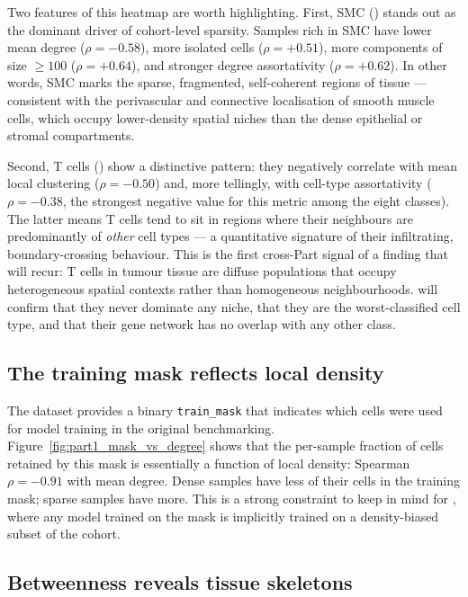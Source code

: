 Two features of this heatmap are worth highlighting. First, SMC () stands out as the dominant driver of cohort-level sparsity. Samples rich in SMC have lower mean degree ($\rho = -0.58$), more isolated cells ($\rho = +0.51$), more components of size $\geq 100$ ($\rho = +0.64$), and stronger degree assortativity ($\rho = +0.62$). In other words, SMC marks the sparse, fragmented, self-coherent regions of tissue --- consistent with the perivascular and connective localisation of smooth muscle cells, which occupy lower-density spatial niches than the dense epithelial or stromal compartments.

Second, T cells () show a distinctive pattern: they negatively correlate with mean local clustering ($\rho = -0.50$) and, more tellingly, with cell-type assortativity ($\rho = -0.38$, the strongest negative value for this metric among the eight classes). The latter means T cells tend to sit in regions where their neighbours are predominantly of \emph{other} cell types --- a quantitative signature of their infiltrating, boundary-crossing behaviour. This is the first cross-Part signal of a finding that will recur: T cells in tumour tissue are diffuse populations that occupy heterogeneous spatial contexts rather than homogeneous neighbourhoods.  will confirm that they never dominate any niche,  that they are the worst-classified cell type, and  that their gene network has no overlap with any other class.
\subsection*{The training mask reflects local density}

The dataset provides a binary \texttt{train\_mask} that indicates which cells were used for model training in the original benchmarking. Figure~\ref{fig:part1_mask_vs_degree} shows that the per-sample fraction of cells retained by this mask is essentially a function of local density: Spearman $\rho = -0.91$ with mean degree. Dense samples have less of their cells in the training mask; sparse samples have more. This is a strong constraint to keep in mind for , where any model trained on the mask is implicitly trained on a density-biased subset of the cohort.

\subsection*{Betweenness reveals tissue skeletons}

